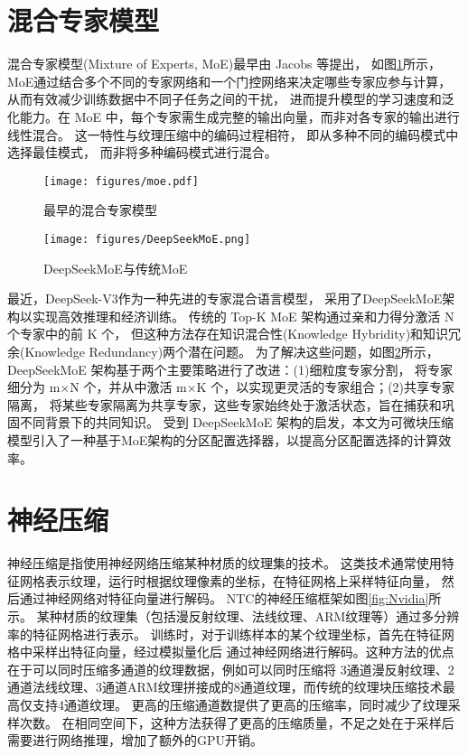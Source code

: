\section{混合专家模型}

混合专家模型(Mixture of Experts, MoE)最早由 Jacobs 等\cite{jacobs1991adaptive}提出，
如图\ref{fig:MoE}所示，MoE通过结合多个不同的专家网络和一个门控网络来决定哪些专家应参与计算，从而有效减少训练数据中不同子任务之间的干扰，
进而提升模型的学习速度和泛化能力。在 MoE 中，每个专家需生成完整的输出向量，而非对各专家的输出进行线性混合。
这一特性与纹理压缩中的编码过程相符，
即从多种不同的编码模式中选择最佳模式，
而非将多种编码模式进行混合。

\begin{figure}[htbp]
    \centering
    \texttt{[image: figures/moe.pdf]}
    \caption{最早的混合专家模型\cite{jacobs1991adaptive}}
    \label{fig:MoE}
\end{figure}

\begin{figure}[htbp]
    \centering
    \texttt{[image: figures/DeepSeekMoE.png]}
    \caption{DeepSeekMoE与传统MoE\cite{dai2024deepseekmoe}}
    \label{fig:DeepSeekMoE}
\end{figure}

最近，DeepSeek-V3\cite{liu2024deepseek}作为一种先进的专家混合语言模型，
采用了DeepSeekMoE架构\cite{dai2024deepseekmoe}以实现高效推理和经济训练。
传统的 Top-K MoE 架构通过亲和力得分激活 N 个专家中的前 K 个，
但这种方法存在知识混合性(Knowledge Hybridity)和知识冗余(Knowledge Redundancy)两个潜在问题。
为了解决这些问题，如图\ref{fig:DeepSeekMoE}所示，DeepSeekMoE 架构基于两个主要策略进行了改进：(1)细粒度专家分割，
将专家细分为 m×N 个，并从中激活 m×K 个，以实现更灵活的专家组合；(2)共享专家隔离，
将某些专家隔离为共享专家，这些专家始终处于激活状态，旨在捕获和巩固不同背景下的共同知识。
受到 DeepSeekMoE 架构的启发，本文为可微块压缩模型引入了一种基于MoE架构的分区配置选择器，以提高分区配置选择的计算效率。


\section{神经压缩}

神经压缩是指使用神经网络压缩某种材质的纹理集的技术。
这类技术通常使用特征网格表示纹理，运行时根据纹理像素的坐标，在特征网格上采样特征向量，
然后通过神经网络对特征向量进行解码。
NTC\cite{vaidyanathan2023random}的神经压缩框架如图\ref{fig:Nvidia}所示。
某种材质的纹理集（包括漫反射纹理、法线纹理、ARM纹理等）通过多分辨率的特征网格进行表示。
训练时，对于训练样本的某个纹理坐标，首先在特征网格中采样出特征向量，经过模拟量化后
通过神经网络进行解码。这种方法的优点在于可以同时压缩多通道的纹理数据，例如可以同时压缩将
3通道漫反射纹理、2通道法线纹理、3通道ARM纹理拼接成的8通道纹理，而传统的纹理块压缩技术最高仅支持4通道纹理。
更高的压缩通道数提供了更高的压缩率，同时减少了纹理采样次数。
在相同空间下，这种方法获得了更高的压缩质量，不足之处在于采样后需要进行网络推理，增加了额外的GPU开销。

